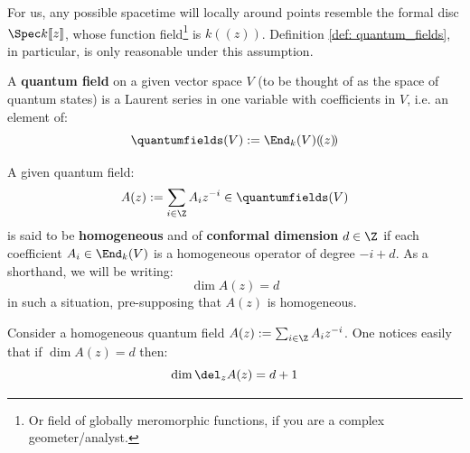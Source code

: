         \begin{convention}
            For us, any possible spacetime will locally around points resemble the formal disc $\Spec k[\![z]\!]$, whose function field\footnote{Or field of globally meromorphic functions, if you are a complex geometer/analyst.} is $k(\!(z)\!)$. Definition \ref{def: quantum_fields}, in particular, is only reasonable under this assumption.
        \end{convention}
    
        \begin{definition} \label{def: quantum_fields}
            A \textbf{quantum field} on a given vector space $V$ (to be thought of as the space of quantum states) is a Laurent series in one variable with coefficients in $V$, i.e. an element of:
                $$\quantumfields(V) := \End_k(V)(\!(z)\!)$$

            A given quantum field:
                $$A(z) := \sum_{i \in \Z} A_i z^{-i} \in \quantumfields(V)$$
            is said to be \textbf{homogeneous} and of \textbf{conformal dimension} $d \in \Z$ if each coefficient $A_i \in \End_k(V)$ is a homogeneous operator of degree $-i + d$. As a shorthand, we will be writing:
                $$\dim A(z) = d$$
            in such a situation, pre-supposing that $A(z)$ is homogeneous.
        \end{definition}
        \begin{remark}
            Consider a homogeneous quantum field $A(z) := \sum_{i \in \Z} A_i z^{-i}$. One notices easily that if $\dim A(z) = d$ then:
                $$\dim \del_z A(z) = d + 1$$
        \end{remark}

